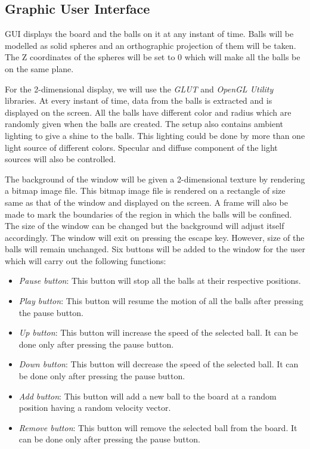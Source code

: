\documentclass{article}
\begin{document}
\subsection{Graphic User Interface} GUI displays the board and the balls on it at any instant of time. Balls will be modelled as solid spheres and an orthographic projection of them will be taken. The Z coordinates of the spheres will be set to 0 which will make all the balls be on the same plane.
\par\noindent For the 2-dimensional display, we will use the \textit{GLUT} and \textit{OpenGL Utility} libraries. At every instant of time, data from the balls is extracted and is displayed on the screen. All the balls have different color and radius which are randomly given when the balls are created. The setup also contains ambient lighting to give a shine to the balls. This lighting could be done by more than one light source of different colors. Specular and diffuse component of the light sources will also be controlled.
\par\noindent The background of the window will be given a 2-dimensional texture by rendering a bitmap image file. This bitmap image file is rendered on a rectangle of size same as that of the window and displayed on the screen. A frame will also be made to mark the boundaries of the region in which the balls will be confined. The size of the window can be changed but the background will adjust itself accordingly. The window will exit on pressing the escape key. However, size of the balls will remain unchanged. Six buttons will be added to the window for the user which will carry out the following functions:

\begin{itemize}
\item \textit{Pause button}: This button will stop all the balls at their respective positions.
\item \textit{Play button}: This button will resume the motion of all the balls after pressing the pause button.
\item \textit{Up button}: This button will increase the speed of the selected ball. It can be done only after pressing the pause button.
\item \textit{Down button}: This button will decrease the speed of the selected ball. It can be done only after pressing the pause button.
\item \textit{Add button}: This button will add a new ball to the board at a random position having a random velocity vector.
\item \textit{Remove button}: This button will remove the selected ball from the board. It can be done only after pressing the pause button.

\end{itemize}
\end{document}
